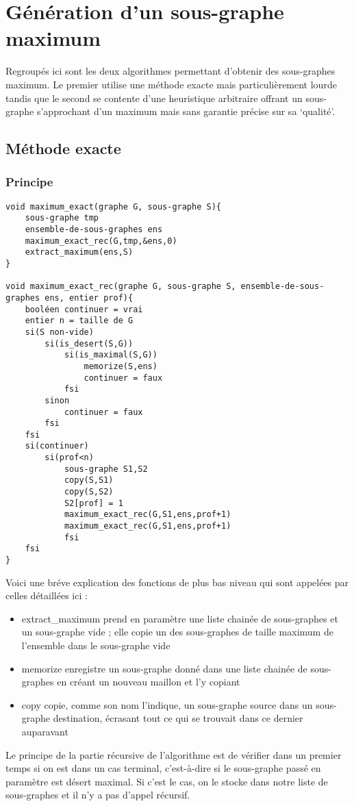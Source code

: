 \section{Génération d'un sous-graphe maximum}

Regroupés ici sont les deux algorithmes permettant d'obtenir des sous-graphes maximum. Le premier utilise une méthode exacte mais particulièrement lourde tandis que le second se contente d'une heuristique arbitraire offrant un sous-graphe s'approchant d'un maximum mais sans garantie précise sur sa `qualité'.

\subsection{Méthode exacte}

\subsubsection{Principe}

\begin{verbatim}
void maximum_exact(graphe G, sous-graphe S){
    sous-graphe tmp
    ensemble-de-sous-graphes ens
    maximum_exact_rec(G,tmp,&ens,0)
    extract_maximum(ens,S)
}

void maximum_exact_rec(graphe G, sous-graphe S, ensemble-de-sous-graphes ens, entier prof){
    booléen continuer = vrai
    entier n = taille de G
    si(S non-vide)
        si(is_desert(S,G))
            si(is_maximal(S,G))
                memorize(S,ens)
                continuer = faux
            fsi
        sinon
            continuer = faux
        fsi
    fsi
    si(continuer)
        si(prof<n)
            sous-graphe S1,S2
            copy(S,S1)
            copy(S,S2)
            S2[prof] = 1
            maximum_exact_rec(G,S1,ens,prof+1)
            maximum_exact_rec(G,S1,ens,prof+1)
		    fsi
    fsi
}
\end{verbatim}

Voici une bréve explication des fonctions de plus bas niveau qui sont appelées par celles détaillées ici : 
\begin{itemize}
	\item{extract\_maximum} prend en paramètre une liste chainée de sous-graphes et un sous-graphe vide ; elle copie un des sous-graphes de taille maximum de l'ensemble dans le sous-graphe vide
	\item{memorize} enregistre un sous-graphe donné dans une liste chainée de sous-graphes en créant un nouveau maillon et l'y copiant
	\item{copy} copie, comme son nom l'indique, un sous-graphe source dans un sous-graphe destination, écrasant tout ce qui se trouvait dans ce dernier auparavant
\end{itemize}
Le principe de la partie récursive de l'algorithme est de vérifier dans un premier temps si on est dans un cas terminal, c'est-à-dire si le sous-graphe passé en paramètre est désert maximal. Si c'est le cas, on le stocke dans notre liste de sous-graphes et il n'y a pas d'appel récursif.

